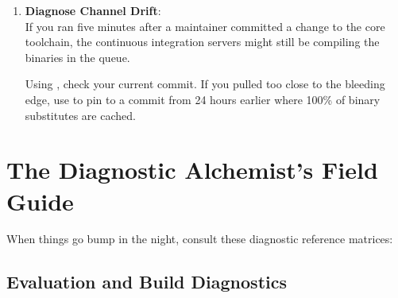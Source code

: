 \begin{enumerate}
  \item \textbf{Diagnose Channel Drift}:\\
    If you ran  five minutes after a maintainer committed a change to the core toolchain, the continuous integration servers might still be compiling the binaries in the queue.
    
    Using , check your current commit. If you pulled too close to the bleeding edge, use  to pin to a commit from 24 hours earlier where 100\% of binary substitutes are cached.
\end{enumerate}

\section{The Diagnostic Alchemist's Field Guide}

When things go bump in the night, consult these diagnostic reference matrices:

\subsection*{Evaluation and Build Diagnostics}

